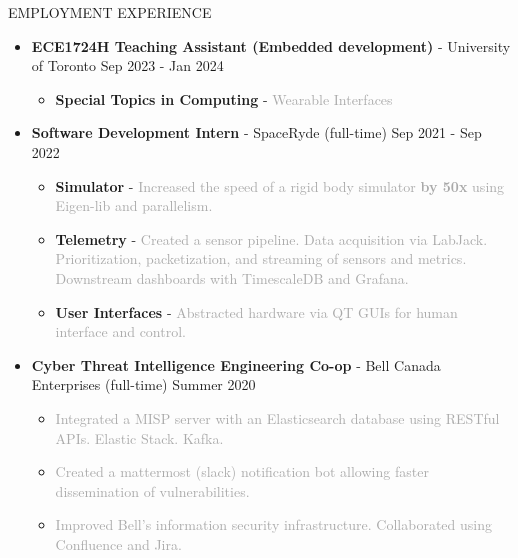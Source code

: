 \documentclass{resume} %
\begin{document}
\begin{rSection}{EMPLOYMENT EXPERIENCE}
    \begin{itemize}
        \item {\bf ECE1724H Teaching Assistant (Embedded development)} - University of Toronto \hfill {Sep 2023 - Jan 2024}
        \begin{itemize}[topsep=-10pt]
            \setlength\itemsep{-0.5em}
                \item[\textbullet] {\bf Special Topics in Computing} - \textcolor{darkgray}{Wearable Interfaces}
            \end{itemize}
        \item {\bf Software Development Intern} - SpaceRyde (full-time) \hfill {Sep 2021 - Sep 2022}
        \begin{itemize}[topsep=-10pt]
            \setlength\itemsep{-0.5em}
            \item[\textbullet] {\bf Simulator} - \textcolor{darkgray}{Increased the speed of a rigid body simulator \textbf{by 50x} using Eigen-lib and parallelism.}
            \item[\textbullet] {\bf Telemetry} - \textcolor{darkgray}{Created a sensor pipeline. Data acquisition via LabJack. Prioritization, packetization, and streaming of sensors and metrics. Downstream dashboards with TimescaleDB and Grafana.}
            \item[\textbullet] {\bf User Interfaces} - \textcolor{darkgray}{Abstracted hardware via QT GUIs for human interface and control.}
        \end{itemize}
        \item {\bf Cyber Threat Intelligence Engineering Co-op} - Bell Canada Enterprises (full-time) \hfill {Summer 2020}
        \begin{itemize}[topsep=-10pt]
            \setlength\itemsep{-0.5em}
            \item[\textbullet] \textcolor{darkgray}{Integrated a MISP server with an Elasticsearch database using RESTful APIs. Elastic Stack. Kafka.}
            \item[\textbullet] \textcolor{darkgray}{Created a mattermost (slack) notification bot allowing faster dissemination of vulnerabilities.}
            \item[\textbullet] \textcolor{darkgray}{Improved Bell's information security infrastructure. Collaborated using Confluence and Jira.}
        \end{itemize}
    \end{itemize}
\end{rSection}
\end{document}
